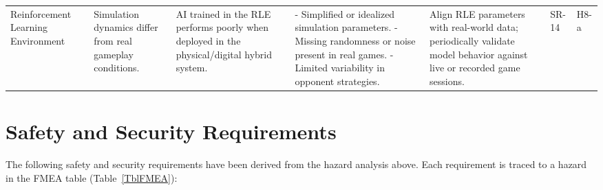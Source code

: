 \documentclass{article}
\begin{document}
\begin{landscape}
\begin{tabularx}{\linewidth}{|P{2.5cm}|Y|Y|Y|Y|P{1cm}|P{1cm}|}
        Reinforcement Learning Environment &
        Simulation dynamics differ from real gameplay conditions. &
        AI trained in the RLE performs poorly when deployed in the physical/digital hybrid system. &
        - Simplified or idealized simulation parameters. \newline - Missing randomness or noise present in real games. \newline - Limited variability in opponent strategies. &
        Align RLE parameters with real-world data; periodically validate model behavior against live or recorded game sessions. &
        SR-14 &
        H8-a \\
    \end{tabularx}
\end{landscape}

\section{Safety and Security Requirements}\label{sec:safety-and-security-requirements}


The following safety and security requirements have been derived from the hazard analysis above.
Each requirement is traced to a hazard in the FMEA table (Table~\ref{TblFMEA}):
\end{document}
